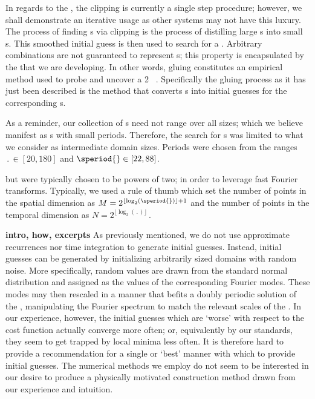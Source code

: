 \begin{description}
{In regards to the \KSe, the clipping is currently a single step procedure; however,
we shall demonstrate an iterative usage as other systems may not have this luxury.
The process of finding {\fpo}s via clipping is the process of distilling large
{\po}s into small {\po}s. This smoothed
initial guess is then used to search for a {\po}. Arbitrary {\fpo} combinations are
not guaranteed to represent {\po}s; this property is encapsulated by the {\symbolic}
that we are developing. In other words, gluing constitutes an empirical method
used to probe and uncover a 2\dmn\ {\spt} {\symbolic}. Specifically the gluing process
as it has just been described is the method that converts {\brick}s into
initial guesses for the corresponding {\po}s.

As a reminder, our collection of {\po}s need not range over all sizes;
which we believe manifest as {\po}s with small periods. Therefore,
the search for {\po}s was limited to what we consider as intermediate domain sizes.
Periods were chosen from the ranges
$\period{}\in [20, 180]$ and $\speriod{} \in [22, 88]$.

but were typically chosen to be powers of two; in order
to leverage fast Fourier transforms. %
Typically, we used a rule of thumb which set the number of points in the
spatial dimension as $M = 2^{\lfloor\log_2(\speriod{})\rfloor + 1}$
and the number of points in the temporal dimension as
$
N = 2^{\lfloor\log_2(\period{})\rfloor}\,.
$

\textbf{intro, how, excerpts}
As previously mentioned, we do not use
approximate recurrences nor time integration
to generate initial guesses.
Instead, initial guesses can be generated by initializing arbitrarily
sized domains with random noise.
More specifically, random values are drawn from the standard normal distribution
and assigned as the values of the corresponding Fourier modes.
These modes may then rescaled in a manner that befits a
doubly periodic solution of the {\KSe},
manipulating the Fourier spectrum to match the relevant scales of the \KSe.
In our experience, however, the initial guesses which are `worse' with respect
to the cost function actually converge more often; or, equivalently by our standards,
they seem to get trapped by local minima less often.
It is therefore hard to provide a recommendation for a single or `best'
manner with which to provide initial guesses. The
numerical methods we employ do not seem to be interested in our desire
to produce a physically motivated construction method
drawn from our experience and intuition.

}
\end{description}
